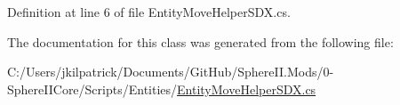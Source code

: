 Definition at line 6 of file Entity\+Move\+Helper\+S\+D\+X.\+cs.



The documentation for this class was generated from the following file\+:\begin{DoxyCompactItemize}
\item 
C\+:/\+Users/jkilpatrick/\+Documents/\+Git\+Hub/\+Sphere\+I\+I.\+Mods/0-\/\+Sphere\+I\+I\+Core/\+Scripts/\+Entities/\mbox{\hyperlink{_entity_move_helper_s_d_x_8cs}{Entity\+Move\+Helper\+S\+D\+X.\+cs}}\end{DoxyCompactItemize}
